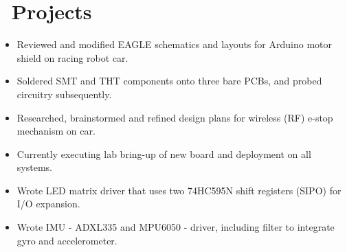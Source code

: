 \documentclass{resume}
\begin{document}
\section{\faFlask\ Projects}

\begin{itemize}
  \item Reviewed and modified EAGLE schematics and layouts for Arduino motor shield on racing robot car.
  \item Soldered SMT and THT components onto three bare PCBs, and probed circuitry subsequently.
  \item Researched, brainstormed and refined design plans for wireless (RF) e-stop mechanism on car.
  \item Currently executing lab bring-up of new board and deployment on all systems.
\end{itemize}

\begin{itemize}
  \item Wrote LED matrix driver that uses two 74HC595N shift registers (SIPO) for I/O expansion.
  \item Wrote IMU - ADXL335 and MPU6050 - driver, including filter to integrate gyro and accelerometer.
\end{itemize}

\begin{comment}
\datedsubsection{\textbf{Hackathons}}{Various}
\begin{itemize}
  \item \href{https://github.com/DChang87/HtN}{Pebble-run dosage notification service - \textit{SmartMeds}; used C.} \hfill Hack the North, 2015
  \item \href{jkkd.com}{IMU-based instructor - \textit{Yoga Yoda}; developed business case. \hfill} PCH Hardware Hackathon, 2015
  \item \href{http://devpost.com/software/drumyo}{Myo-controlled air drum kit - \textit{DruMyo}; used C++. \hfill} hackWaterloo, 2014
  \item \href{https://github.com/fanwashere/SolidWorksControls}{Myo-enabled Solidworks controller; used Lua. \hfill} Hack the North, 2014
\end{itemize}
\end{comment}
\end{document}
